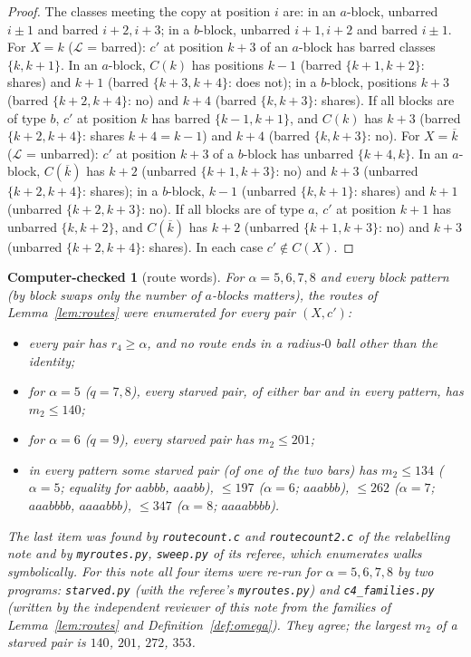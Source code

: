 \documentclass[11pt]{amsart}
\newcommand{\file}[1]{\nolinkurl{#1}}
\theoremstyle{plain}
\newtheorem{computer}{Computer-checked}
\theoremstyle{definition}
\theoremstyle{remark}
\newcommand{\cL}{\mathcal{L}}
\newcommand{\bk}[1]{\overline{#1}}
\begin{document}
\begin{proof}
The classes meeting the copy at position $i$ are: in an $a$-block, unbarred $i \pm 1$ and barred $i+2, i+3$; in a
$b$-block, unbarred $i+1, i+2$ and barred $i \pm 1$.
For $X = k$ ($\cL$ = barred): $c'$ at position $k+3$ of an $a$-block has barred classes $\{k, k+1\}$. In an $a$-block,
$C(k)$ has positions $k-1$ (barred $\{k+1, k+2\}$: shares) and $k+1$ (barred $\{k+3, k+4\}$: does not); in a $b$-block,
positions $k+3$ (barred $\{k+2, k+4\}$: no) and $k+4$ (barred $\{k, k+3\}$: shares). If all blocks are of type $b$, $c'$
at position $k$ has barred $\{k-1, k+1\}$, and $C(k)$ has $k+3$ (barred $\{k+2, k+4\}$: shares $k + 4 = k - 1$) and $k+4$
(barred $\{k, k+3\}$: no).
For $X = \bk k$ ($\cL$ = unbarred): $c'$ at position $k+3$ of a $b$-block has unbarred $\{k+4, k\}$. In an $a$-block,
$C(\bk k)$ has $k+2$ (unbarred $\{k+1, k+3\}$: no) and $k+3$ (unbarred $\{k+2, k+4\}$: shares); in a $b$-block, $k-1$
(unbarred $\{k, k+1\}$: shares) and $k+1$ (unbarred $\{k+2, k+3\}$: no). If all blocks are of type $a$, $c'$ at position
$k+1$ has unbarred $\{k, k+2\}$, and $C(\bk k)$ has $k+2$ (unbarred $\{k+1, k+3\}$: no) and $k+3$ (unbarred
$\{k+2, k+4\}$: shares). In each case $c' \notin C(X)$.
\end{proof}

\begin{computer}[route words]\label{cc:routes}
For $\alpha = 5, 6, 7, 8$ and every block pattern (by block swaps only the number of $a$-blocks matters), the routes of
Lemma~\ref{lem:routes} were enumerated for every pair $(X, c')$:
\begin{itemize}[leftmargin=1.5em]
\item every pair has $r_4 \ge \alpha$, and no route ends in a radius-$0$ ball other than the identity;
\item for $\alpha = 5$ ($q = 7, 8$), every starved pair, of either bar and in every pattern, has $m_2 \le 140$;
\item for $\alpha = 6$ ($q = 9$), every starved pair has $m_2 \le 201$;
\item in every pattern some starved pair (of one of the two bars) has $m_2 \le 134$ ($\alpha = 5$; equality for
  $aabbb$, $aaabb$), $\le 197$ ($\alpha = 6$; $aaabbb$), $\le 262$ ($\alpha = 7$; $aaabbbb$, $aaaabbb$), $\le 347$
  ($\alpha = 8$; $aaaabbbb$).
\end{itemize}
The last item was found by \file{routecount.c} and \file{routecount2.c} of the relabelling note and by
\file{myroutes.py}, \file{sweep.py} of its referee, which enumerates walks symbolically. For this note all four items
were re-run for $\alpha = 5, 6, 7, 8$ by two programs: \file{starved.py} (with the referee's \file{myroutes.py}) and
\file{c4_families.py} (written by the independent reviewer of this note from the families of Lemma~\ref{lem:routes} and
Definition~\ref{def:omega}). They agree; the largest $m_2$ of a starved pair is $140$, $201$, $272$, $353$.
\end{computer}
\end{document}

